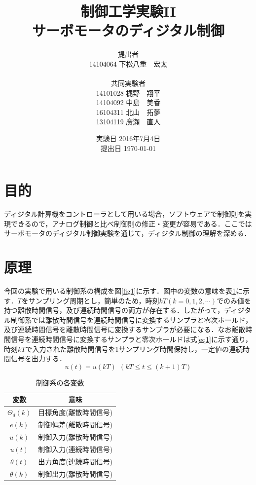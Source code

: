 \documentclass[11pt,a4paper]{jsarticle}
\begin{document}
\title{制御工学実験II \\ サーボモータのディジタル制御}
\author{提出者 \\ 14104064 下松八重　宏太 \\ \\ 共同実験者 \\ 14101028 梶野　翔平 \\ 14104092 中島　美香 \\ 16104311 北山　拓夢 \\ 13104119 廣瀬　直人}
\date{実験日 2016年7月4日 \\ 提出日 \today}



\maketitle
\thispagestyle{empty}
\newpage


\section{目的}
ディジタル計算機をコントローラとして用いる場合，ソフトウェアで制御則を実現できるので，アナログ制御と比べ制御則の修正・変更が容易である．ここではサーボモータのディジタル制御実験を通じて，ディジタル制御の理解を深める．
\section{原理}
今回の実験で用いる制御系の構成を図\ref{fig1}に示す．図中の変数の意味を表\ref{tab1}に示す．$T$をサンプリング周期とし，簡単のため，時刻$kT(k=0,1,2,\cdots)$でのみ値を持つ離散時間信号，及び連続時間信号の両方が存在する．したがって，ディジタル制御系では離散時間信号を連続時間信号に変換するサンプラと零次ホールド，及び連続時間信号を離散時間信号に変換するサンプラが必要になる．なお離散時間信号を連続時間信号に変換するサンプラと零次ホールドは式\ref{eq1}に示す通り，時刻$kT$で入力された離散時間信号を1サンプリング時間保持し，一定値の連続時間信号を出力する．
\begin{equation}
 u(t) = u(kT)\ \ (kT \le t \leq (k+1)T)
  \label{eq1}
\end{equation}

\begin{table}[b]
 \begin{center}
  \caption{制御系の各変数}
  \label{tab1}
  \begin{tabular}{|c|c|} \hline
   変数 & 意味 \\ \hline \hline
   $\Theta_d (k)$ & 目標角度(離散時間信号) \\ \hline
   $e(k)$         & 制御偏差(離散時間信号) \\ \hline
   $u(k)$         & 制御入力(離散時間信号) \\ \hline
   $u(t)$         & 制御入力(連続時間信号) \\ \hline
   $\theta (t)$   & 出力角度(連続時間信号) \\ \hline
   $\theta (k)$   & 制御出力(離散時間信号) \\ \hline
  \end{tabular}
 \end{center}
\end{table}
\end{document}
